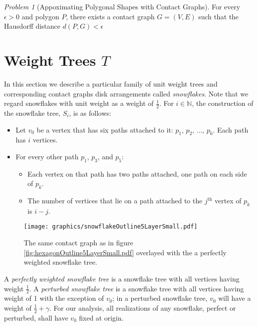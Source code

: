 \documentclass[10pt]{CSUNthesis}
\theoremstyle{plain}%
\theoremstyle{definition}
\theoremstyle{remark}
\newtheorem{prob}{Problem}
\newcommand{\bbN}{{\mathbb{N}}}
\begin{document}
\begin{prob}[Appoximating Polygonal Shapes with Contact Graphs]\label{problem:ApproxShapesWithContactGraphs}
For every $\epsilon >0$ and polygon $P$, there exists a contact graph $G = (V,E)$  such that the Hausdorff distance $d(P,G) < \epsilon$
\end{prob}\section{Weight Trees $T$}
In this section we describe a particular family of unit weight trees and corresponding contact graphs disk arrangements called \textit{snowflakes}.  
Note that we regard snowflakes with unit weight as a weight of $\frac{1}{2}$.  
For $i \in \bbN$, the construction of the snowflake tree, $S_i$, is as follows:
\begin{itemize}
\item Let $v_0$ be a vertex that has six paths attached to it: $p_1$, $p_2$, $\dots$, $p_6$.  Each path has $i$ vertices.
\item For every other path $p_1$, $p_3$, and $p_5$: 
	\begin{itemize}
		\item 	Each vertex on that path has two paths attached, one path on each side of $p_k$.
		\item	The number of vertices that lie on a path attached to the $j^\text{th}$ vertex of $p_k$ is $i-j$.
	\end{itemize}
\end{itemize}

\begin{figure}[!htbp]
\begin{center}
\texttt{[image: graphics/snowflakeOutline5LayerSmall.pdf]}
\caption{The same contact graph as in figure \ref{fig:hexagonOutline5LayerSmall.pdf} overlayed with the a perfectly weighted snowflake tree.}\label{fig:snowflakeOutline5LayerSmall.pdf}
\end{center}
\end{figure}

A \textit{perfectly weighted snowflake tree} is a snowflake tree with all vertices having weight $\frac{1}{2}$.   
A \textit{perturbed snowflake tree} is a snowflake tree with all vertices having weight of 1 with the exception of $v_0$;  in a perturbed snowflake tree, $v_0$ will have a weight of $\frac{1}{2} + \gamma$.  
For our analysis, all realizations of any snowflake, perfect or perturbed, shall have $v_0$ fixed at origin.  
\end{document}
